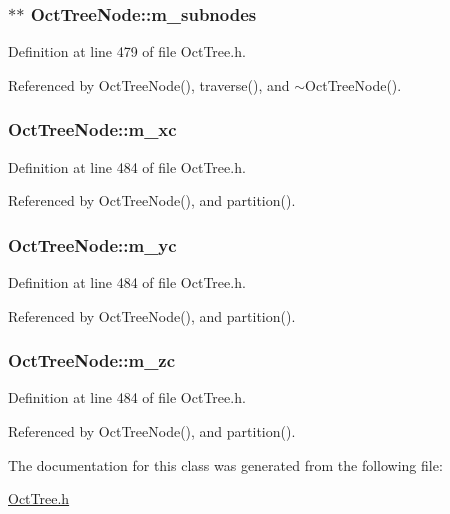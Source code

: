 \subsubsection[{m\_\-subnodes}]{$\ast$$\ast$ {\bf OctTreeNode::m\_\-subnodes}}\label{classOctTreeNode_aa778da4b6fd434a63e0e4513c41b72a6}


Definition at line 479 of file OctTree.h.



Referenced by OctTreeNode(), traverse(), and $\sim$OctTreeNode().

\subsubsection[{m\_\-xc}]{ {\bf OctTreeNode::m\_\-xc}}\label{classOctTreeNode_a20fc5c24ea0fbc484e172a4b1e01984b}


Definition at line 484 of file OctTree.h.



Referenced by OctTreeNode(), and partition().

\subsubsection[{m\_\-yc}]{ {\bf OctTreeNode::m\_\-yc}}\label{classOctTreeNode_a53921672607551866f5d6d681b65da3c}


Definition at line 484 of file OctTree.h.



Referenced by OctTreeNode(), and partition().

\subsubsection[{m\_\-zc}]{ {\bf OctTreeNode::m\_\-zc}}\label{classOctTreeNode_ac305397d3ca59d857d8bf2775f8172dc}


Definition at line 484 of file OctTree.h.



Referenced by OctTreeNode(), and partition().



The documentation for this class was generated from the following file:\begin{DoxyCompactItemize}
\item 
\hyperlink{OctTree_8h}{OctTree.h}\end{DoxyCompactItemize}

